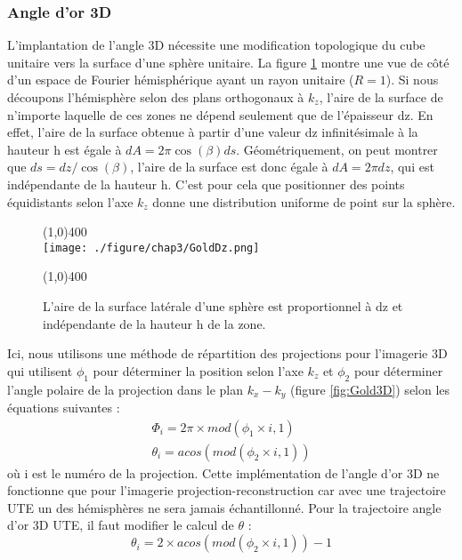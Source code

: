 \subsubsection{Angle d'or 3D}

L'implantation de l'angle 3D nécessite une modification topologique du cube unitaire vers la surface d'une sphère unitaire. La figure \ref{fig:GoldDz} montre une vue de côté d'un espace de Fourier hémisphérique ayant un rayon unitaire ($R = 1$). Si nous découpons l'hémisphère selon des plans orthogonaux à $k_z$, l'aire de la surface de n'importe laquelle de ces zones ne dépend seulement que de l'épaisseur dz. En effet, l'aire de la surface obtenue à partir d'une valeur dz infinitésimale à la hauteur h est égale à $dA = 2\pi \cos(\beta)ds$. Géométriquement, on peut montrer que $ds = dz/\cos(\beta)$, l'aire de la surface est donc égale à $dA = 2\pi dz$, qui est indépendante de la hauteur h. C'est pour cela que positionner des points équidistants selon l'axe $k_z$ donne une distribution uniforme de point sur la sphère.
\begin{figure}[H]
\centering \line(1,0){400} \\
\texttt{[image: ./figure/chap3/GoldDz.png]}
\caption[Transformation topologique]{\label{fig:GoldDz} L'aire de la surface latérale d'une sphère est proportionnel à dz et indépendante de la hauteur h de la zone.}
\line(1,0){400} \\ \end{figure}

Ici, nous utilisons une méthode de répartition des projections pour l'imagerie 3D qui utilisent $\phi_1$ pour déterminer la position selon l'axe $k_z$ et $\phi_2$ pour déterminer l'angle polaire de la projection dans le plan $k_x-k_y$ (figure \ref{fig:Gold3D}) selon les équations suivantes :
\begin{equation}
\begin{array}{c}
\Phi_i=2\pi \times mod(\phi_1 \times i,1) \\
\theta_i=acos(mod(\phi_2 \times i,1))
\end{array}
\end{equation}
où i est le numéro de la projection. Cette implémentation de l'angle d'or 3D ne fonctionne que pour l'imagerie projection-reconstruction car avec une trajectoire UTE un des hémisphères ne sera jamais échantillonné. Pour la trajectoire angle d'or 3D UTE, il faut modifier le calcul de $\theta$ :
\begin{equation}
\theta_i=2 \times acos(mod(\phi_2 \times i,1))-1
\end{equation}

